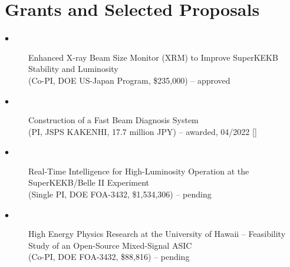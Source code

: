 \documentclass[12pt]{article}
\begin{document}
{\section*{\large{Grants and Selected Proposals}} 
{\footnotesize
\begin{description}
\item[$\bullet$]{Enhanced X-ray Beam Size Monitor (XRM) to Improve SuperKEKB Stability and Luminosity \\
\hspace{-0.25in} (Co-PI, DOE US-Japan Program, \$235,000) -- approved}
\item[$\bullet$]{Construction of a Fast Beam Diagnosis System \\
\hspace{-0.25in} (PI, JSPS KAKENHI, 17.7 million JPY) -- awarded, 04/2022 []} \\
\item[$\bullet$]{Real-Time Intelligence for High-Luminosity Operation at the SuperKEKB/Belle II Experiment \\
\hspace{-0.25in} (Single PI, DOE FOA-3432, \$1,534,306) -- pending}
\item[$\bullet$]{High Energy Physics Research at the University of Hawaii -- Feasibility Study of an Open-Source Mixed-Signal ASIC \\
\hspace{-0.25in} (Co-PI, DOE FOA-3432, \$88,816) -- pending}
\end{description}
}

\vspace{-0.2in}
}
\end{document}
